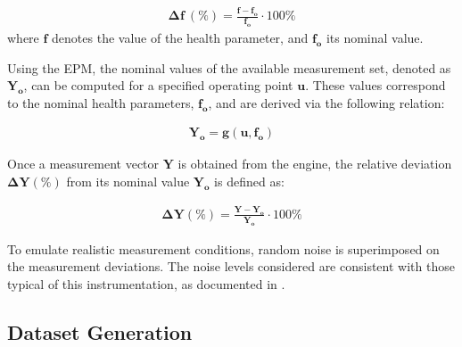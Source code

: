 \documentclass{ecai}
\begin{document}
\begin{eqnarray}\label{eq:deltaf}
    \mathbf{\Delta f}\ (\%) = \frac{\mathbf{f} - \mathbf{f_o}}{\mathbf{f_o}} \cdot 100\%
\end{eqnarray}
%
where $\mathbf{f}$ denotes the value of the health parameter, and $\mathbf{f_o}$ its nominal value.

Using the EPM, the nominal values of the available measurement set, denoted as $\mathbf{Y_o}$, 
can be computed for a specified operating point $\mathbf{u}$. These values correspond to the nominal health parameters, $\mathbf{f_o}$, and are derived via the following relation:

\begin{eqnarray}\label{eq:epmnom}
\mathbf{Y_o} = \mathbf{g}(\mathbf{u}, \mathbf{f_o})
\end{eqnarray}

Once a measurement vector $\mathbf{Y}$ is obtained from the engine, the relative deviation $\mathbf{\Delta Y(\%)}$
from its nominal value $\mathbf{Y_o}$ is defined as:

\begin{eqnarray}\label{eq:deltay}
    \mathbf{\Delta Y}(\%) = \frac{\mathbf{Y} - \mathbf{Y_o}}{\mathbf{Y_o}} \cdot 100\%
\end{eqnarray}

To emulate realistic measurement conditions, random noise is superimposed on the measurement 
deviations. The noise levels considered are consistent with those typical of this instrumentation, 
as documented in \citep{romesis_model-assisted_2024}.

\subsection{Dataset Generation}
\end{document}
